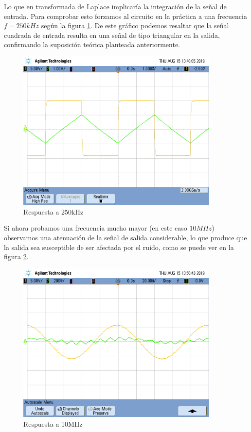 Lo que en transformada de Laplace implicar\'ia la integraci\'on de la se\~nal de entrada. Para comprobar esto forzamos al circuito en la pr\'actica a una frecuencia $f=250kHz$ seg\'un la figura \ref{fig: altafrec_2}. De este gr\'afico podemos resaltar que la se\~nal cuadrada de entrada resulta en una se\~nal de tipo triangular en la salida, confirmando la suposici\'on te\'orica planteada anteriormente.

\begin{figure}[H]
    \centering
    \includegraphics[width=0.9\textwidth]{./EJ2/EJ2_integrador.png}
    \caption{Respuesta a 250kHz}
    \label{fig: altafrec_2} 
\end{figure}

 Si ahora probamos una frecuencia mucho mayor (en este caso $10MHz$) observamos una atenuaci\'on de la se\~nal de salida considerable, lo que produce que la salida sea susceptible de ser afectada por el ruido, como se puede ver en la figura \ref{fig: noise_2}.
 
 \begin{figure}[H]
    \centering
    \includegraphics[width=0.9\textwidth]{./EJ2/EJ2_rta_alta_frec.png}
    \caption{Respuesta a 10MHz}
    \label{fig: noise_2}
\end{figure}
 
